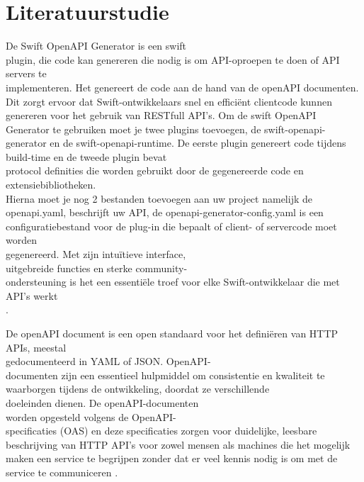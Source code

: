 
\section{Literatuurstudie}%
\label{sec:literatuurstudie}
De Swift OpenAPI Generator is een swift \\plugin, die code kan genereren die nodig is om API-oproepen te doen of API servers te \\implementeren. Het genereert de code aan de hand van de openAPI documenten. Dit zorgt ervoor dat Swift-ontwikkelaars snel en efficiënt clientcode kunnen genereren voor het gebruik van RESTfull API’s. Om de swift OpenAPI \\Generator te gebruiken moet je twee plugins toevoegen, de swift-openapi-generator en de swift-openapi-runtime. De eerste plugin genereert code tijdens build-time en de tweede plugin bevat \\protocol definities die worden gebruikt door de gegenereerde code en extensiebibliotheken.\\Hierna moet je nog 2 bestanden toevoegen aan uw project namelijk de openapi.yaml, beschrijft uw API, de openapi-generator-config.yaml is een configuratiebestand voor de plug-in die bepaalt of client- of servercode moet worden \\gegenereerd. Met zijn intuïtieve interface, \\uitgebreide functies en sterke community-\\ondersteuning is het een essentiële troef voor elke Swift-ontwikkelaar die met API's werkt \\ \autocite{Dvorsky2023} . 

De openAPI document is een open standaard voor het definiëren van HTTP APIs, meestal \\gedocumenteerd in YAML of JSON. OpenAPI-\\documenten zijn een essentieel hulpmiddel om consistentie en kwaliteit te waarborgen tijdens de ontwikkeling, doordat ze verschillende \\doeleinden dienen. De openAPI-documenten \\worden opgesteld volgens de OpenAPI-\\specificaties (OAS) en deze specificaties zorgen voor duidelijke, leesbare beschrijving van HTTP API’s voor zowel mensen als machines die het mogelijk maken een service te begrijpen zonder dat er veel kennis nodig is om met de service te communiceren \autocite{Miller2020}. 

